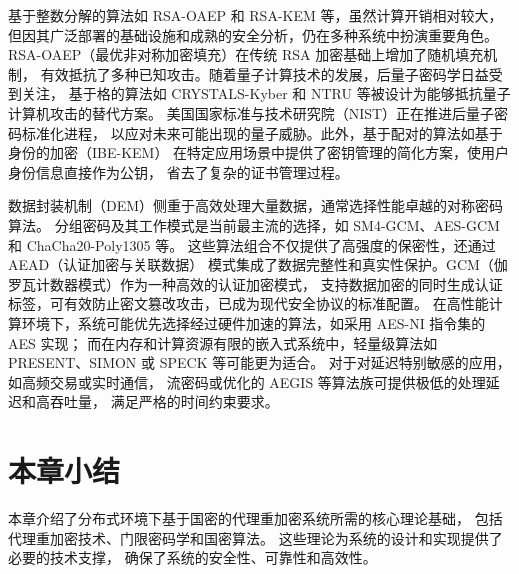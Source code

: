 基于整数分解的算法如 RSA-OAEP 和 RSA-KEM 等，虽然计算开销相对较大，
但因其广泛部署的基础设施和成熟的安全分析，仍在多种系统中扮演重要角色。
RSA-OAEP（最优非对称加密填充）在传统 RSA 加密基础上增加了随机填充机制，
有效抵抗了多种已知攻击。随着量子计算技术的发展，后量子密码学日益受到关注，
基于格的算法如 CRYSTALS-Kyber 和 NTRU 等被设计为能够抵抗量子计算机攻击的替代方案。
美国国家标准与技术研究院（NIST）正在推进后量子密码标准化进程，
以应对未来可能出现的量子威胁。此外，基于配对的算法如基于身份的加密（IBE-KEM）
在特定应用场景中提供了密钥管理的简化方案，使用户身份信息直接作为公钥，
省去了复杂的证书管理过程。

数据封装机制（DEM）侧重于高效处理大量数据，通常选择性能卓越的对称密码算法。
分组密码及其工作模式是当前最主流的选择，如 SM4-GCM、AES-GCM 和 ChaCha20-Poly1305 等。
这些算法组合不仅提供了高强度的保密性，还通过 AEAD（认证加密与关联数据）
模式集成了数据完整性和真实性保护。GCM（伽罗瓦计数器模式）作为一种高效的认证加密模式，
支持数据加密的同时生成认证标签，可有效防止密文篡改攻击，已成为现代安全协议的标准配置。
在高性能计算环境下，系统可能优先选择经过硬件加速的算法，如采用 AES-NI 指令集的 AES 实现；
而在内存和计算资源有限的嵌入式系统中，轻量级算法如 PRESENT、SIMON 或 SPECK 等可能更为适合。
对于对延迟特别敏感的应用，如高频交易或实时通信，
流密码或优化的 AEGIS 等算法族可提供极低的处理延迟和高吞吐量，
满足严格的时间约束要求。

\section{本章小结}

本章介绍了分布式环境下基于国密的代理重加密系统所需的核心理论基础，
包括代理重加密技术、门限密码学和国密算法。
这些理论为系统的设计和实现提供了必要的技术支撑，
确保了系统的安全性、可靠性和高效性。
